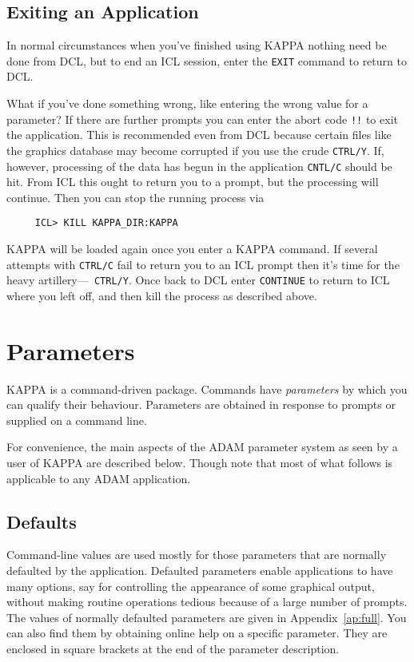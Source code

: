 \subsection{Exiting an Application}
In normal circumstances when you've finished using {\small KAPPA}
nothing need be done from {\small DCL}, but to end an {\small ICL}
session, enter the {\tt EXIT} command to return to {\small DCL}.

What if you've done something wrong, like entering the wrong value
for a parameter?  If there are further prompts you can enter the
abort code {\tt !!} to exit the application.  This is recommended
even from {\small DCL} because certain files like the graphics
database may become corrupted if you use the crude {\tt CTRL/Y}.
If, however, processing of the data has begun in the application
{\tt CNTL/C} should be hit.  From {\small ICL} this ought to return
you to a prompt, but the processing will continue.  Then you can stop
the running process via

\small
\begin{verbatim}
     ICL> KILL KAPPA_DIR:KAPPA
\end{verbatim}
\normalsize
{\small KAPPA} will be loaded again once you enter a {\small KAPPA}
command. If several attempts with {\tt CTRL/C} fail to return you to an
{\small ICL} prompt then it's time for the heavy artillery---{\tt
CTRL/Y}.  Once back to {\small DCL} enter {\tt CONTINUE} to return to
{\small ICL} where you left off, and then kill the process as described
above.

\section{Parameters}
\label{se:param}
{\small KAPPA} is a command-driven package.  Commands have
{\em parameters\/} by which you can qualify their behaviour.
Parameters are obtained in response to prompts or supplied on a
command line.

For convenience, the main aspects of the {\small ADAM} parameter system
as seen by a user of {\small KAPPA} are described below.  Though note
that most of what follows is applicable to any {\small ADAM}
application.

\subsection{Defaults}
\label{se:defaults}
Command-line values are used mostly for those parameters
that are normally defaulted by the application.   Defaulted parameters
enable applications to have many options, say for controlling the appearance
of some graphical output, without making routine operations tedious because
of a large number of prompts. The values of normally defaulted
parameters are given in Appendix~\ref{ap:full}. You can also find them
by obtaining online help on a specific parameter.  They are enclosed
in square brackets at the end of the parameter description.

